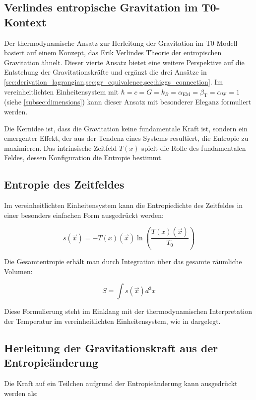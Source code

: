 \documentclass[12pt,a4paper]{article}
\newcommand{\Tfield}{T(x)}
\newcommand{\Tzero}{T_0}
\newcommand{\betaT}{\beta_{\text{T}}}
\newcommand{\alphaEM}{\alpha_{\text{EM}}}
\newcommand{\alphaW}{\alpha_{\text{W}}}
\newcommand{\vecx}{\vec{x}}
\begin{document}
	\subsection{Verlindes entropische Gravitation im T0-Kontext}
	\label{subsec:verlinde}
	Der thermodynamische Ansatz zur Herleitung der Gravitation im T0-Modell basiert auf einem Konzept, das Erik Verlindes Theorie der entropischen Gravitation ähnelt. Dieser vierte Ansatz bietet eine weitere Perspektive auf die Entstehung der Gravitationskräfte und ergänzt die drei Ansätze in \cref{sec:derivation_lagrangian,sec:gr_equivalence,sec:higgs_connection}. Im vereinheitlichten Einheitensystem mit \(\hbar = c = G = k_B = \alphaEM = \betaT = \alphaW = 1\) (siehe \cref{subsec:dimensions}) kann dieser Ansatz mit besonderer Eleganz formuliert werden.
	
	Die Kernidee ist, dass die Gravitation keine fundamentale Kraft ist, sondern ein emergenter Effekt, der aus der Tendenz eines Systems resultiert, die Entropie zu maximieren. Das intrinsische Zeitfeld \(\Tfield\) spielt die Rolle des fundamentalen Feldes, dessen Konfiguration die Entropie bestimmt.
	
	\subsection{Entropie des Zeitfeldes}
	Im vereinheitlichten Einheitensystem kann die Entropiedichte des Zeitfeldes in einer besonders einfachen Form ausgedrückt werden:
	
	\begin{equation}
		s(\vecx) = -\Tfield(\vecx) \ln\left(\frac{\Tfield(\vecx)}{\Tzero}\right)
	\end{equation}
	
	Die Gesamtentropie erhält man durch Integration über das gesamte räumliche Volumen:
	
	\begin{equation}
		S = \int s(\vecx) d^3x
	\end{equation}
	
	Diese Formulierung steht im Einklang mit der thermodynamischen Interpretation der Temperatur im vereinheitlichten Einheitensystem, wie in \cite{pascher_temp_2025} dargelegt.
	
	\subsection{Herleitung der Gravitationskraft aus der Entropieänderung}
	Die Kraft auf ein Teilchen aufgrund der Entropieänderung kann ausgedrückt werden als:
	
\end{document}
